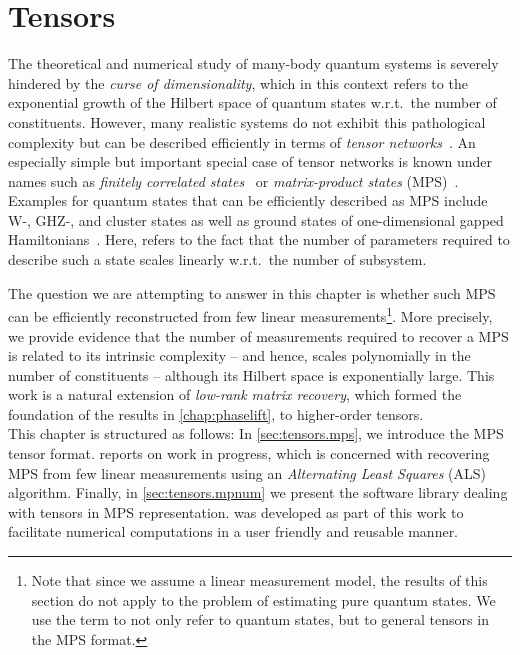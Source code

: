 \chapter{Tensors}
\label{chap:tensors}

The theoretical and numerical study of many-body quantum systems is severely hindered by the \emph{curse of dimensionality}, which in this context refers to the exponential growth of the Hilbert space of quantum states w.r.t.\ the number of constituents.
However, many realistic systems do not exhibit this pathological complexity but can be described efficiently in terms of \emph{tensor networks}~\cite{}.
An especially simple but important special case of tensor networks is known under names such as \emph{finitely correlated states}~\cite{Fannes_1992_Finitely} or \emph{matrix-product states} (MPS)~\cite{Garcia_2006_Matrix,Verstraete_2008_Matrix,Orus_2014_Practical}.
Examples for quantum states that can be efficiently described as MPS include W-, GHZ-, and cluster states as well as ground states of one-dimensional gapped Hamiltonians~\cite{}.
Here,  refers to the fact that the number of parameters required to describe such a state scales linearly w.r.t.\ the number of subsystem.

The question we are attempting to answer in this chapter is whether such MPS can be efficiently reconstructed from few linear measurements\footnote{%
  Note that since we assume a linear measurement model, the results of this section do not apply to the problem of estimating pure quantum states.
  We use the term  to not only refer to quantum states, but to general tensors in the MPS format.
}.
More precisely, we provide evidence that the number of measurements required to recover a MPS is related to its intrinsic complexity -- and hence, scales polynomially in the number of constituents -- although its Hilbert space is exponentially large.
This work is a natural extension of \emph{low-rank matrix recovery}, which formed the foundation of the results in \cref{chap:phaselift}, to higher-order tensors.\\


This chapter is structured as follows:
In \cref{sec:tensors.mps}, we introduce the MPS tensor format.
 reports on work in progress, which is concerned with recovering MPS from few linear measurements using an \emph{Alternating Least Squares} (ALS) algorithm.
Finally, in \cref{sec:tensors.mpnum} we present the software library \mpnum dealing with tensors in MPS representation.
\mpnum was developed as part of this work to facilitate numerical computations in a user friendly and reusable manner.



